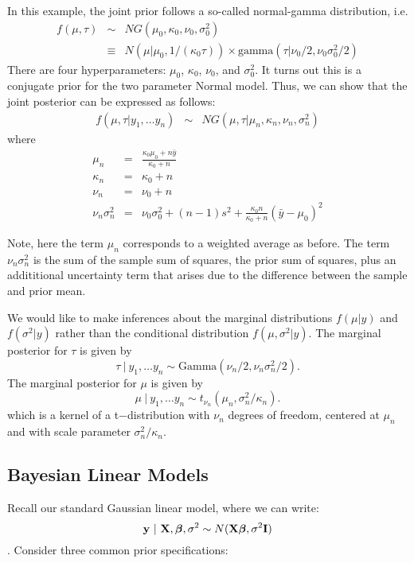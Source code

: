 In this example, the joint prior follows a so-called normal-gamma distribution, i.e.
\begin{eqnarray*}
f(\mu, \tau)  &\sim&  NG(\mu_0 ,\kappa_0, \nu_0, \sigma^2_0) \\
&\equiv& N(\mu | \mu_0, 1/(\kappa_0 \tau)) \times \mbox{gamma} (\tau | \nu_0/2 , \nu_0 \sigma^2_0/2) 
\end{eqnarray*}
There are four hyperparameters: $\mu_0$, $\kappa_0$, $\nu_0$, and $\sigma_0^2$.
It turns out this is a conjugate prior for the two parameter Normal model.
Thus, we can show that the joint posterior can be expressed as follows:
\begin{eqnarray*}
f(\mu, \tau | y_1, \ldots y_n)  &\sim&  NG(\mu, \tau | \mu_n ,\kappa_n, \nu_n, \sigma_n^2) 
\end{eqnarray*}
where
\begin{eqnarray*}
\mu_n &=& \frac{\kappa_0 \mu_0 + n {\bar y}}{\kappa_0 + n}\\
\kappa_n &=& \kappa_0 + n\\
\nu_n &=& \nu_0 + n \\
\nu_n \sigma_n^2 &=& \nu_0 \sigma_0^2 + (n-1) s^2 + \frac{\kappa_0 n}{\kappa_0 + n} (\bar y - \mu_0)^2
\end{eqnarray*}


Note, here the term $\mu_n$ corresponds to a weighted average as before.
The term $\nu_n \sigma_n^2$ is the sum of the sample sum of squares, the prior sum of squares, plus an addititional uncertainty term that arises due to the difference between the sample and prior mean.

We would like to make inferences about the marginal distributions $f(\mu | y)$ and $f(\sigma^2 | y)$ rather than the conditional distribution $f(\mu , \sigma^2 | y)$.
The marginal posterior for $\tau$ is given by
$$
\tau ~|~ y_1, \ldots y_n \sim \mbox{Gamma}(\nu_n/2, \nu_n \sigma_n^2/2).
$$
The marginal posterior for $\mu$ is given by
$$
\mu ~|~ y_1, \ldots y_n \sim t_{\nu_n}(\mu_n, \sigma_n^2/\kappa_n).
$$
which is a kernel of a  t−distribution with $\nu_n$ degrees of freedom, centered at $\mu_n$ and with scale parameter $\sigma_n^2/\kappa_n$.


\subsection{Bayesian Linear Models}

Recall our standard Gaussian linear model, where we can write:
$$\mathbf{y} ~|~ \mathbf{X}, \boldsymbol{\beta}, \sigma^2
\sim N(\mathbf{X} \boldsymbol{\beta}, \sigma^2 \mathbf{I})$$. Consider three common prior specifications:

